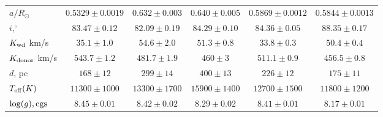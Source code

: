 \begin{landscape}
\begin{table}
\begin{tabular}{lccccc}
                $a/R_{\odot}$               & $0.5329\pm0.0019$     & $0.632\pm0.003$       & $0.640\pm0.005$       & $0.5869\pm0.0012$     & $0.5844\pm0.0013$     \\
                $i, ^\circ$                 & $83.47\pm0.12$        & $82.09\pm0.19$        & $84.29\pm0.10$        & $84.36\pm0.05$        & $88.35\pm0.17$        \\
                $K_{\rm wd}$ km/s           & $35.1\pm1.0$          & $54.6\pm2.0$          & $51.3\pm0.8$          & $33.8\pm0.3$          & $50.4\pm0.4$          \\
                $K_{\rm donor}$ km/s        & $543.7\pm1.2$         & $481.7\pm1.9$         & $460\pm3$             & $511.1\pm0.9$         & $456.5\pm0.8$         \\
                \hline
                $d$, pc                     & $168\pm12$            & $299\pm14$            & $400\pm13$            & $226\pm12$            & $175\pm11$            \\
                $T_{\rm eff} (K)$           & $11300\pm1000$        & $13300\pm1700$        & $15900\pm1400$        & $12700\pm1500$        & $11800\pm1200$        \\
                $\log(g), {\rm cgs}$        & $8.45\pm0.01$         & $8.42\pm0.02$         & $8.29\pm0.02$         & $8.41\pm0.01$         & $8.17\pm0.01$         \\
                \hline
                \hline
            \end{tabular}
        \end{table}



\end{landscape}
